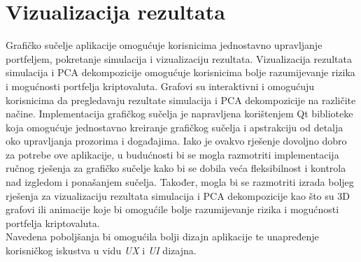 \documentclass[zavrsnirad, upload]{fer}
\begin{document}
\section{Vizualizacija rezultata}
\label{sek:vizualizacija_rezultata_rezultati}
Grafičko sučelje aplikacije omogućuje korisnicima jednostavno
upravljanje portfeljem, pokretanje simulacija i vizualizaciju rezultata.
Vizualizacija rezultata simulacija i PCA dekompozicije
omogućuje korisnicima bolje razumijevanje rizika i mogućnosti portfelja
kriptovaluta. Grafovi su interaktivni i omogućuju korisnicima
da pregledavaju rezultate simulacija i PCA dekompozicije na različite načine.
Implementacija grafičkog sučelja je napravljena korištenjem Qt biblioteke
koja omogućuje jednostavno kreiranje grafičkog sučelja i apstrakciju
od detalja oko upravljanja prozorima i događajima.
Iako je ovakvo rješenje dovoljno dobro za potrebe ove aplikacije,
u budućnosti bi se mogla razmotriti implementacija ručnog rješenja
za grafičko sučelje kako bi se dobila veća fleksibilnost i kontrola
nad izgledom i ponašanjem sučelja. Također, mogla bi se razmotriti
izrada boljeg rješenja za vizualizaciju rezultata simulacija i PCA dekompozicije
kao što su 3D grafovi ili animacije koje bi omogućile bolje razumijevanje
rizika i mogućnosti portfelja kriptovaluta.\\
Navedena poboljšanja bi omogućila bolji dizajn aplikacije
te unapređenje korisničkog iskustva u vidu \textit{UX} i \textit{UI} dizajna.
\end{document}
